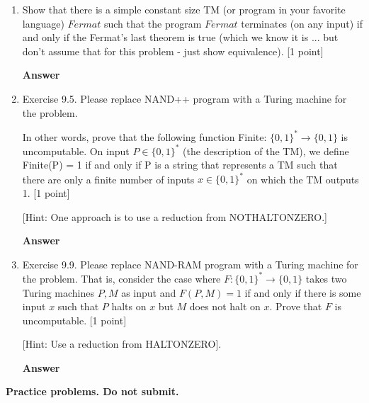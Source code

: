 \documentclass[11pt]{article}
\newcommand \kw[1]{\textbf{#1}}
\newenvironment{answer}{
\vspace{.5cm}
\begin{mdframed}[]
    \kw{Answer} 
}
{
\end{mdframed}
\pagebreak
}
\begin{document}
\begin{enumerate}
\begin{answer}
\begin{verbatim}
    \end{verbatim}
\end{answer}


\item Show that there is a simple constant size TM (or program in your favorite language) $Fermat$ such that the program $Fermat$ terminates (on any input) if and only if the Fermat's last theorem is true (which we know it is ... but don't assume that for this problem - just show equivalence). [1 point]

\begin{answer}

\end{answer}

\item Exercise 9.5. Please replace NAND++ program with a Turing machine for the problem. 

In other words, prove that the following function Finite: $\{0,1\}^* \rightarrow \{0,1\}$ is uncomputable. On input $P \in \{0,1\}^*$ (the description of the TM), we define Finite(P) = 1 if and only if P is a string that represents a TM such that there are only a finite number of inputs $x \in \{0,1\}^*$ on which the TM outputs 1.
[1 point]

[Hint: One approach is to use a reduction from NOTHALTONZERO.]

\begin{answer}

\end{answer}

\item Exercise 9.9. Please replace NAND-RAM program with a Turing machine for the problem. That is, consider the case where $F:\{0,1\}^* \rightarrow \{0,1\}$ takes two Turing machines $P,M$ as input and $F(P,M) = 1$ if and only if there is some input $x$ such that $P$ halts on $x$ but $M$ does not halt on $x$. Prove that $F$ is uncomputable. [1 point]

[Hint: Use a reduction from HALTONZERO].

\begin{answer}

\end{answer}   

\end{enumerate}

{\bf Practice problems. Do not submit.}
\end{document}
